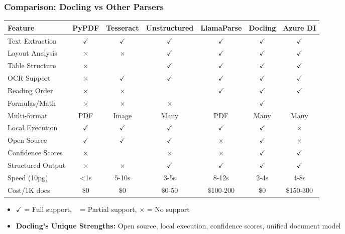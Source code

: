 \begin{frame}[fragile]\frametitle{Comparison: Docling vs Other Parsers}

\begin{table}[h]
\centering
\tiny
\begin{tabular}{|l|c|c|c|c|c|c|}
\hline
\textbf{Feature} & \textbf{PyPDF} & \textbf{Tesseract} & \textbf{Unstructured} & \textbf{LlamaParse} & \textbf{Docling} & \textbf{Azure DI} \\
\hline
Text Extraction & $\checkmark$ & $\checkmark$ & $\checkmark$ & $\checkmark$ & $\checkmark$ & $\checkmark$ \\
\hline
Layout Analysis & $ \times $ & $ \times $ & $\checkmark$ & $\checkmark$ & $\checkmark$ & $\checkmark$ \\
\hline
Table Structure & $ \times $ & ~ & $\checkmark$ & $\checkmark$ & $\checkmark$ & $\checkmark$ \\
\hline
OCR Support & $ \times $ & $\checkmark$ & $\checkmark$ & $\checkmark$ & $\checkmark$ & $\checkmark$ \\
\hline
Reading Order & $ \times $ & $ \times $ & ~ & $\checkmark$ & $\checkmark$ & $\checkmark$ \\
\hline
Formulas/Math & $ \times $ & $ \times $ & $ \times $ & ~ & $\checkmark$ & ~ \\
\hline
Multi-format & PDF & Image & Many & PDF & Many & Many \\
\hline
Local Execution & $\checkmark$ & $\checkmark$ & $\checkmark$ & $ \checkmark $ & $\checkmark$ & $ \times $ \\
\hline
Open Source & $\checkmark$ & $\checkmark$ & $\checkmark$ & $ \times $ & $\checkmark$ & $ \times $ \\
\hline
Confidence Scores & $ \times $ & ~ & $ \times $ & $ \times $ & $\checkmark$ & $\checkmark$ \\
\hline
Structured Output & $ \times $ & $ \times $ & $\checkmark$ & $\checkmark$ & $\checkmark$ & $\checkmark$ \\
\hline
Speed (10pg) & <1s & 5-10s & 3-5s & 8-12s & 2-4s & 4-8s \\
\hline
Cost/1K docs & \$0 & \$0 & \$0-50 & \$100-200 & \$0 & \$150-300 \\
\hline
\end{tabular}
\end{table}

      \begin{itemize}
        \item $\checkmark$ = Full support, ~ = Partial support, $ \times $ = No support
        \item \textbf{Docling's Unique Strengths:} Open source, local execution, confidence scores, unified document model
      \end{itemize}
\end{frame}

